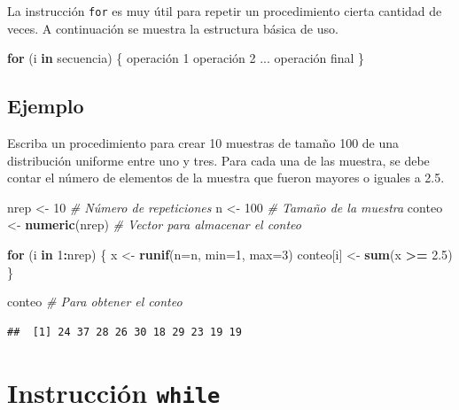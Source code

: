 \documentclass[10pt,]{krantz}
\makeatletter
\newenvironment{Shaded}{\begin{snugshade}}{\end{snugshade}}
\newcommand{\KeywordTok}[1]{\textcolor[rgb]{0.13,0.29,0.53}{\textbf{#1}}}
\newcommand{\DataTypeTok}[1]{\textcolor[rgb]{0.13,0.29,0.53}{#1}}
\newcommand{\DecValTok}[1]{\textcolor[rgb]{0.00,0.00,0.81}{#1}}
\newcommand{\FloatTok}[1]{\textcolor[rgb]{0.00,0.00,0.81}{#1}}
\newcommand{\StringTok}[1]{\textcolor[rgb]{0.31,0.60,0.02}{#1}}
\newcommand{\CommentTok}[1]{\textcolor[rgb]{0.56,0.35,0.01}{\textit{#1}}}
\newcommand{\ControlFlowTok}[1]{\textcolor[rgb]{0.13,0.29,0.53}{\textbf{#1}}}
\newcommand{\OperatorTok}[1]{\textcolor[rgb]{0.81,0.36,0.00}{\textbf{#1}}}
\newcommand{\NormalTok}[1]{#1}
\newenvironment{kframe}{%
\medskip{}
\setlength{\fboxsep}{.8em}
 \def\at@end@of@kframe{}%
 \ifinner\ifhmode%
  \def\at@end@of@kframe{\end{minipage}}%
  \begin{minipage}{\columnwidth}%
 \fi\fi%
 \def\FrameCommand##1{\hskip\@totalleftmargin \hskip-\fboxsep
 \colorbox{shadecolor}{##1}\hskip-\fboxsep
     \hskip-\linewidth \hskip-\@totalleftmargin \hskip\columnwidth}%
 \MakeFramed {\advance\hsize-\width
   \@totalleftmargin\z@ \linewidth\hsize
   \@setminipage}}%
 {\par\unskip\endMakeFramed%
 \at@end@of@kframe}
\renewenvironment{Shaded}{\begin{kframe}}{\end{kframe}}
\makeatother
\begin{document}
La instrucción \texttt{for} es muy útil para repetir un procedimiento
cierta cantidad de veces. A continuación se muestra la estructura básica
de uso.

\begin{Shaded}
\begin{Highlighting}[]
\ControlFlowTok{for}\NormalTok{ (i }\ControlFlowTok{in}\NormalTok{ secuencia) \{}
\NormalTok{  operación }\DecValTok{1}
\NormalTok{  operación }\DecValTok{2}
\NormalTok{  ...}
\NormalTok{  operación final}
\NormalTok{\}}
\end{Highlighting}
\end{Shaded}

\subsection*{Ejemplo}\label{ejemplo-17}


Escriba un procedimiento para crear 10 muestras de tamaño 100 de una
distribución uniforme entre uno y tres. Para cada una de las muestra, se
debe contar el número de elementos de la muestra que fueron mayores o
iguales a 2.5.

\begin{Shaded}
\begin{Highlighting}[]
\NormalTok{nrep <-}\StringTok{ }\DecValTok{10}  \CommentTok{# Número de repeticiones}
\NormalTok{n <-}\StringTok{ }\DecValTok{100}    \CommentTok{# Tamaño de la muestra}
\NormalTok{conteo <-}\StringTok{ }\KeywordTok{numeric}\NormalTok{(nrep)  }\CommentTok{# Vector para almacenar el conteo}

\ControlFlowTok{for}\NormalTok{ (i }\ControlFlowTok{in} \DecValTok{1}\OperatorTok{:}\NormalTok{nrep) \{}
\NormalTok{  x <-}\StringTok{ }\KeywordTok{runif}\NormalTok{(}\DataTypeTok{n=}\NormalTok{n, }\DataTypeTok{min=}\DecValTok{1}\NormalTok{, }\DataTypeTok{max=}\DecValTok{3}\NormalTok{)}
\NormalTok{  conteo[i] <-}\StringTok{ }\KeywordTok{sum}\NormalTok{(x }\OperatorTok{>=}\StringTok{ }\FloatTok{2.5}\NormalTok{)}
\NormalTok{\}}

\NormalTok{conteo  }\CommentTok{# Para obtener el conteo}
\end{Highlighting}
\end{Shaded}

\begin{verbatim}
##  [1] 24 37 28 26 30 18 29 23 19 19
\end{verbatim}

\section{\texorpdfstring{Instrucción \texttt{while}
}{Instrucción while }}\label{instruccion-while}
\end{document}
